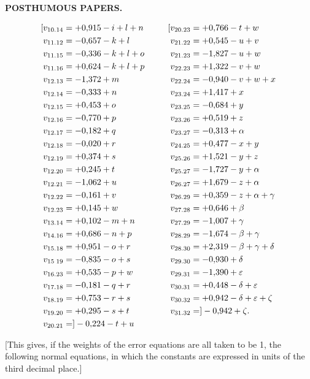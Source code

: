 \par\clearpage
\noindent{}\hfill{\small\textbf{POSTHUMOUS PAPERS.}}\hfill\null\par\medskip
\[
\begin{aligned}
\makebox[0pt][r]{[}v_{10.14}&=+0{,}915-i+l+n &\qquad \makebox[0pt][r]{[}v_{20.23}&=+0{,}766-t+w\\
v_{11.12}&=-0{,}657-k+l &\qquad v_{21.22}&=+0{,}545-u+v\\
v_{11.15}&=-0{,}336-k+l+o &\qquad v_{21.23}&=-1{,}827-u+w\\
v_{11.16}&=+0{,}624-k+l+p &\qquad v_{22.23}&=+1{,}322-v+w\\
v_{12.13}&=-1{,}372+m &\qquad v_{22.24}&=-0{,}940-v+w+x\\
v_{12.14}&=-0{,}333+n &\qquad v_{23.24}&=+1{,}417+x\\
v_{12.15}&=+0{,}453+o &\qquad v_{23.25}&=-0{,}684+y\\
v_{12.16}&=-0{,}770+p &\qquad v_{23.26}&=+0{,}519+z\\
v_{12.17}&=-0{,}182+q &\qquad v_{23.27}&=-0{,}313+\alpha\\
v_{12.18}&=-0{,}020+r &\qquad v_{24.25}&=+0{,}477-x+y\\
v_{12.19}&=+0{,}374+s &\qquad v_{25.26}&=+1{,}521-y+z\\
v_{12.20}&=+0{,}245+t &\qquad v_{25.27}&=-1{,}727-y+\alpha\\
v_{12.21}&=-1{,}062+u &\qquad v_{26.27}&=+1{,}679-z+\alpha\\
v_{12.22}&=-0{,}161+v &\qquad v_{26.29}&=+0{,}359-z+\alpha+\gamma\\
v_{12.23}&=+0{,}145+w &\qquad v_{27.28}&=+0{,}646+\beta\\
v_{13.14}&=+0{,}102-m+n &\qquad v_{27.29}&=-1{,}007+\gamma\\
v_{14.16}&=+0{,}686-n+p &\qquad v_{28.29}&=-1{,}674-\beta+\gamma\\
v_{15.18}&=+0{,}951-o+r &\qquad v_{28.30}&=+2{,}319-\beta+\gamma+\delta\\
v_{15\;19}&=-0{,}835-o+s &\qquad v_{29.30}&=-0{,}930+\delta\\
v_{16.23}&=+0{,}535-p+w &\qquad v_{29.31}&=-1{,}390+\varepsilon\\
v_{17.18}&=-0{,}181-q+r &\qquad v_{30.31}&=+0{,}448-\delta+\varepsilon\\
v_{18.19}&=+0{,}753-r+s &\qquad v_{30.32}&=+0{,}942-\delta+\varepsilon+\zeta\\
v_{19.20}&=+0{,}295-s+t &\qquad v_{31.32}&=]-0{,}942+\zeta.\\
v_{20.21}&=]-0{,}224-t+u &\qquad &\\
\end{aligned}
\]
\par\medskip
\par\noindent\hspace*{\parindent}[This gives, if the weights of the error equations are all
taken to be 1, the following normal equations, in which
the constants are expressed in units of the third decimal place.]

